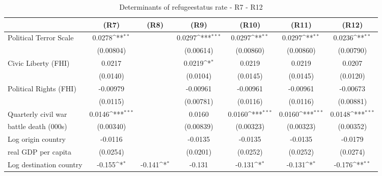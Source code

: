 \begin{table}[!ht]\centering \scriptsize
\def\sym#1{\ifmmode^{#1}\else\(^{#1}\)\fi}
\caption{Determinants of refugeestatus rate - R7 - R12}
\begin{tabular}{l*{6}{c}}
\hline\hline
                    &\multicolumn{1}{c}{(R7)}&\multicolumn{1}{c}{(R8)}&\multicolumn{1}{c}{(R9)}&\multicolumn{1}{c}{(R10)}&\multicolumn{1}{c}{(R11)}&\multicolumn{1}{c}{(R12)}\\    
\hline
Political Terror Scale&      0.0278\sym{**} &                     &      0.0297\sym{***}&      0.0297\sym{**} &      0.0297\sym{**} &      0.0236\sym{**} \\
                    &   (0.00804)         &                     &   (0.00614)         &   (0.00860)         &   (0.00860)         &   (0.00790)         \\
[0,5em]
Civic Liberty (FHI) &      0.0217         &                     &      0.0219\sym{*}  &      0.0219         &      0.0219         &      0.0207         \\
                    &    (0.0140)         &                     &    (0.0104)         &    (0.0145)         &    (0.0145)         &    (0.0120)         \\
[0,5em]
Political Rights (FHI)&    -0.00979         &                     &    -0.00961         &    -0.00961         &    -0.00961         &    -0.00673         \\
                    &    (0.0115)         &                     &   (0.00781)         &    (0.0116)         &    (0.0116)         &   (0.00881)         \\
[0,5em]
Quarterly civil war &      0.0146\sym{***}&                     &      0.0160         &      0.0160\sym{***}&      0.0160\sym{***}&      0.0148\sym{***}\\
battle death (000s)                    &   (0.00340)         &                     &   (0.00839)         &   (0.00323)         &   (0.00323)         &   (0.00352)         \\
[0,5em]
Log origin country&     -0.0116         &                     &     -0.0135         &     -0.0135         &     -0.0135         &     -0.0179         \\
 real GDP per capita                    &    (0.0254)         &                     &    (0.0201)         &    (0.0252)         &    (0.0252)         &    (0.0274)         \\
[0,5em]
Log destination country&      -0.155\sym{*}  &      -0.141\sym{*}  &      -0.131         &      -0.131\sym{*}  &      -0.131\sym{*}  &      -0.176\sym{**} \\

\end{tabular}
\end{table}
